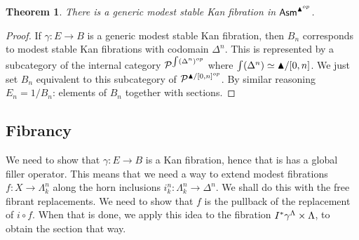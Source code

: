 \documentclass{amsart}
\theoremstyle{plain}
\newtheorem{theorem}{Theorem}
\theoremstyle{definition}
\newcommand\hide[1]{}
\newcommand\cat\mathcal
\begin{document}
\begin{theorem} There is a generic modest stable Kan fibration in $\mathsf{Asm}^{\blacktriangle^{op}}$. \end{theorem}

\begin{proof} If $\gamma: E\to B$ is a generic modest stable Kan fibration, then $B_n$ corresponds to modest stable Kan fibrations with codomain $\Delta^n$. This is represented by a subcategory of the internal category $\cat P^{\elt(\Delta^n)\dual}$ where $\int(\Delta^n) \simeq \blacktriangle/[0,n]$. We just set $B_n$ equivalent to this subcategory of $\cat P^{\simpcat/[0,n]\dual}$. By similar reasoning $E_n = 1/B_n$: elements of $B_n$ together with sections.
\end{proof}

\subsection{Fibrancy}
We need to show that $\gamma: E\to B$ is a Kan fibration, hence that is has a global filler operator. This means that we need a way to extend modest fibrations $f:X\to \Lambda^n_k$ along the horn inclusions $i^n_k:\Lambda^n_k \to \Delta^n$. \hide{We hebben al een filler op de rand\dots of niet? Niet helemaal, want $\Lambda^n_k$ is geen Kan complex. Maar $\Delta^{n-1}$ zijn dat wel. De truuk is dan dat de filler die we bekijken de bestaande fillers uitbreiden. Dan zijn we helemaal klaar, lijkt me. }
We shall do this with the free fibrant replacements. We need to show that $f$ is the pullback of the replacement of $i\circ f$. When that is done, we apply this idea to the fibration $I^*\gamma^\Lambda\times \Lambda$, to obtain the section that way.





\hide{Het idee met $\Lambda \to \Delta$ is nog steeds dat we voor elke simplex van codimensie 1 een retractie kunnen vinden en dat dat de limiet dwingt om gelijk te blijven. We zitten nu met een paar problemen.
Probeer het dan zo: we nemen het zich net gedragen product/ coproduct van simplical sets, waarvan de pullback inderdaad gelijk is. Dan hoeven we alleen nog maar de beargumenteren dat de inclusie in de vrije Kanfibratie dat niet verpest.

1: pak die grote fibratie.
2: neemt het product van simplicial sets
3: er is een categorie van filler algebras, waarbij de operators een uitbreiding zijn van bestaande fillers op de randen. [waar komen die vandaan?]

We moeten twee dingen bewijzen. Dat $\gamma$ een fibratie is, maar ook dat $B$ het is! Dat laatste is het probleem.


}
\end{document}
